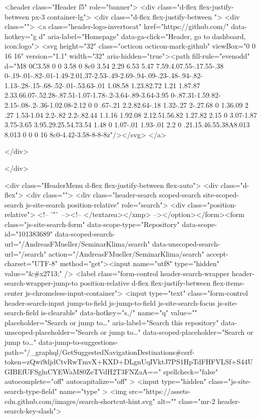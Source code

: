         
<header class="Header  f5" role="banner">
  <div class="d-flex flex-justify-between px-3 container-lg">
    <div class="d-flex flex-justify-between ">
      <div class="">
        <a class="header-logo-invertocat" href="https://github.com/" data-hotkey="g d" aria-label="Homepage" data-ga-click="Header, go to dashboard, icon:logo">
  <svg height="32" class="octicon octicon-mark-github" viewBox="0 0 16 16" version="1.1" width="32" aria-hidden="true"><path fill-rule="evenodd" d="M8 0C3.58 0 0 3.58 0 8c0 3.54 2.29 6.53 5.47 7.59.4.07.55-.17.55-.38 0-.19-.01-.82-.01-1.49-2.01.37-2.53-.49-2.69-.94-.09-.23-.48-.94-.82-1.13-.28-.15-.68-.52-.01-.53.63-.01 1.08.58 1.23.82.72 1.21 1.87.87 2.33.66.07-.52.28-.87.51-1.07-1.78-.2-3.64-.89-3.64-3.95 0-.87.31-1.59.82-2.15-.08-.2-.36-1.02.08-2.12 0 0 .67-.21 2.2.82.64-.18 1.32-.27 2-.27.68 0 1.36.09 2 .27 1.53-1.04 2.2-.82 2.2-.82.44 1.1.16 1.92.08 2.12.51.56.82 1.27.82 2.15 0 3.07-1.87 3.75-3.65 3.95.29.25.54.73.54 1.48 0 1.07-.01 1.93-.01 2.2 0 .21.15.46.55.38A8.013 8.013 0 0 0 16 8c0-4.42-3.58-8-8-8z"/></svg>
</a>

      </div>

    </div>

    <div class="HeaderMenu d-flex flex-justify-between flex-auto">
      <div class="d-flex">
            <div class="">
              <div class="header-search scoped-search site-scoped-search js-site-search position-relative" role="search">
  <div class="position-relative">
    <!-- '"` --><!-- </textarea></xmp> --></option></form><form class="js-site-search-form" data-scope-type="Repository" data-scope-id="101383689" data-scoped-search-url="/AndreasFMueller/SeminarKlima/search" data-unscoped-search-url="/search" action="/AndreasFMueller/SeminarKlima/search" accept-charset="UTF-8" method="get"><input name="utf8" type="hidden" value="&#x2713;" />
      <label class="form-control header-search-wrapper header-search-wrapper-jump-to position-relative d-flex flex-justify-between flex-items-center js-chromeless-input-container">
        <input type="text"
          class="form-control header-search-input jump-to-field js-jump-to-field js-site-search-focus js-site-search-field is-clearable"
          data-hotkey="s,/"
          name="q"
          value=""
          placeholder="Search or jump to…"
          aria-label="Search this repository"
          data-unscoped-placeholder="Search or jump to…"
          data-scoped-placeholder="Search or jump to…"
          data-jump-to-suggestions-path="/_graphql/GetSuggestedNavigationDestinations#csrf-token=zQwi9djdCtvRwTmvX+KXD+DLgnUqIVktJ7PS1HpTdFHFVLSf+S44UGIBEfUFSglnCYEWaM80ZeTVdH2T3FNZaA=="
          spellcheck="false"
          autocomplete="off"
          autocapitalize="off"
          >
          <input type="hidden" class="js-site-search-type-field" name="type" >
            <img src="https://assets-cdn.github.com/images/search-shortcut-hint.svg" alt="" class="mr-2 header-search-key-slash">

